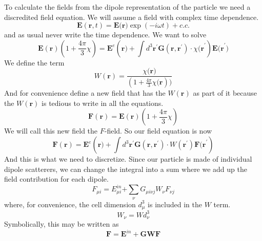 \documentclass{article}
\begin{document}
To calculate the fields from the dipole representation of the particle we
need a discredited field equation. We will assume a field with complex time
dependence.%
\begin{equation}
\mathbf{E}\left( \mathbf{r},t\right) =\mathbf{E(r})\exp (-i\omega t)+c.c.
\label{Field}
\end{equation}%
and as usual never write the time dependence. We want to solve%
\begin{equation}
\mathbf{E}(\mathbf{r})(1+\frac{4\pi }{3}\chi )=\mathbf{E}^{e}(\mathbf{r)+}%
\int d^{3}\mathbf{r}^{\prime }\mathbf{G}\left( \mathbf{r},\mathbf{r}^{\prime
}\right) \cdot \chi \mathbf{(r}^{\prime })\mathbf{E(r}^{\prime })
\end{equation}%
We define the term%
\begin{equation}
W\left( \mathbf{r}\right) =\frac{\chi \mathbf{(r})}{(1+\frac{4\pi }{3}\chi 
\mathbf{(r}))}  \label{W1}
\end{equation}%
And for convenience define a new field that has the $W\left( \mathbf{r}%
\right) $ as part of it because the $W\left( \mathbf{r}\right) $ is tedious
to write in all the equations. 
\begin{equation*}
\mathbf{F}(\mathbf{r})=\mathbf{E}(\mathbf{r})(1+\frac{4\pi }{3}\chi )
\end{equation*}%
We will call this new field the $F$-field. So our field equation is now 
\begin{equation}
\mathbf{F}(\mathbf{r})=\mathbf{E}^{e}(\mathbf{r)+}\int d^{3}\mathbf{r}%
^{\prime }\mathbf{G}\left( \mathbf{r},\mathbf{r}^{\prime }\right) \cdot
W\left( \mathbf{r}^{\prime }\right) \mathbf{F(r}^{\prime })  \label{F-field}
\end{equation}%
And this is what we need to discretize. Since our particle is made of
individual dipole scatterers, we can change the integral into a sum where we
add up the field contribution for each dipole. 
\begin{equation}
F_{\mu i}=E_{\mu i}^{in}\mathbf{+}\sum\limits_{\nu }G_{\mu i\nu j}W_{\nu
}F_{\nu j}  \label{AlgF}
\end{equation}%
where, for convenience, the cell dimension $d_{\mu }^{3}$ is included in the 
$W$ term. 
\begin{equation}
W_{\nu }=Wd_{\nu }^{3}
\end{equation}%
Symbolically, this may be written as 
\begin{equation}
\mathbf{F}=\mathbf{E}^{in}+\mathbf{GWF}
\end{equation}
\end{document}
